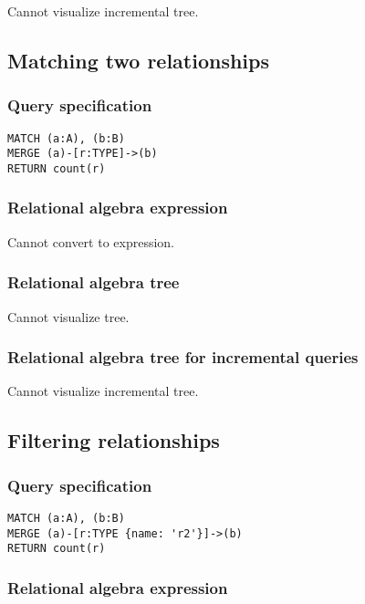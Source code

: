 Cannot visualize incremental tree.

\subsection{Matching two relationships}

\subsubsection*{Query specification}

\begin{lstlisting}
MATCH (a:A), (b:B)
MERGE (a)-[r:TYPE]->(b)
RETURN count(r)
\end{lstlisting}

\subsubsection*{Relational algebra expression}

Cannot convert to expression.

\subsubsection*{Relational algebra tree}

Cannot visualize tree.

\subsubsection*{Relational algebra tree for incremental queries}

Cannot visualize incremental tree.

\subsection{Filtering relationships}

\subsubsection*{Query specification}

\begin{lstlisting}
MATCH (a:A), (b:B)
MERGE (a)-[r:TYPE {name: 'r2'}]->(b)
RETURN count(r)
\end{lstlisting}

\subsubsection*{Relational algebra expression}

